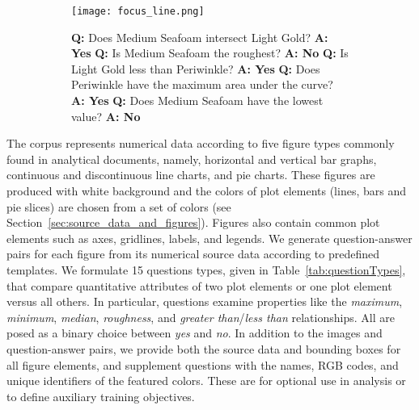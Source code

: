 \documentclass{article} \usepackage{iclr2018_workshop,times}
\begin{document}
\begin{figure}[h]
    \centering
    \caption{Sample line plot figure with question-answer pairs.}
    \label{fig:sample_line_qa}
    \begin{subfigure}[]{0.65\textwidth}
        \texttt{[image: focus\_line.png]}
    \end{subfigure}
    \hfill
    \begin{subfigure}[]{0.3\textwidth}
        \textbf{Q:} Does Medium Seafoam intersect Light Gold?\newline
        \textbf{A: Yes}\newline\newline
        \textbf{Q:} Is Medium Seafoam the roughest?\newline
        \textbf{A: No}\newline\newline
        \textbf{Q:} Is Light Gold less than Periwinkle?\newline
        \textbf{A: Yes}\newline\newline
        \textbf{Q:} Does Periwinkle have the maximum area under the curve?\newline
        \textbf{A: Yes}\newline\newline
        \textbf{Q:} Does Medium Seafoam have the lowest value?\newline
        \textbf{A: No}
    \end{subfigure}
\end{figure}

The corpus represents numerical data according to five figure types commonly found in analytical documents, namely, horizontal and vertical bar graphs, continuous and discontinuous line charts, and pie charts. These figures are produced with white background and the colors of plot elements (lines, bars and pie slices) are chosen from a set of  colors (see Section~\ref{sec:source_data_and_figures}). Figures also contain common plot elements such as axes, gridlines, labels, and legends.
We generate question-answer pairs for each figure from its numerical source data according to predefined templates. We formulate 15 questions types, given in Table~\ref{tab:questionTypes}, that compare quantitative attributes of two plot elements or one plot element versus all others. In particular, questions examine properties like the \emph{maximum}, \emph{minimum}, \emph{median}, \emph{roughness}, and \emph{greater than}/\emph{less than} relationships. All are posed as a binary choice between \emph{yes} and \emph{no}.
In addition to the images and question-answer pairs, we provide both the source data and bounding boxes for all figure elements, and supplement questions with the names, RGB codes, and unique identifiers of the featured colors. These are for optional use in analysis or to define auxiliary training objectives.
\end{document}
